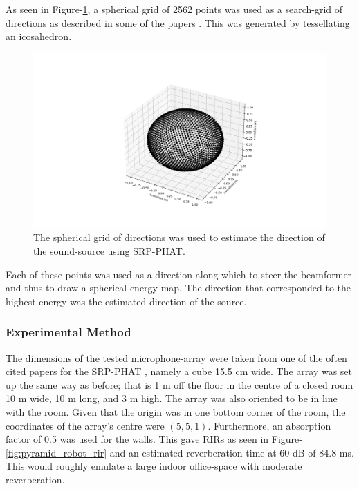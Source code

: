 \documentclass[notitlepage]{report}
\begin{document}
As seen in Figure-\ref{fig:srp_phat_grid}, a spherical grid of 2562 points was used as a search-grid of directions as described in some of the papers \cite{valin_localization_2004} \cite{valin_robust_2007}. This was generated by tessellating an icosahedron.

\begin{figure}[H]
\includegraphics[width=1\textwidth]{../Python/srp_phat/grid.png}
\centering
\caption{The spherical grid of directions was used to estimate the direction of the sound-source using SRP-PHAT.}
\label{fig:srp_phat_grid}
\centering
\end{figure}

Each of these points was used as a direction along which to steer the beamformer and thus to draw a spherical energy-map. The direction that corresponded to the highest energy was the estimated direction of the source.

\subsubsection{Experimental Method}

The dimensions of the tested microphone-array were taken from one of the often cited papers for the SRP-PHAT \cite{valin_robust_2007}, namely a cube 15.5 \si{cm} wide. The array was set up the same way as before; that is 1 \si{m} off the floor in the centre of a closed room 10 \si{m} wide, 10 \si{m} long, and 3 \si{m} high. The array was also oriented to be in line with the room. Given that the origin was in one bottom corner of the room, the coordinates of the array's centre were $(5,5,1)$. Furthermore, an absorption factor of 0.5 was used for the walls. This gave RIRs as seen in Figure-\ref{fig:pyramid_robot_rir} and an estimated reverberation-time at 60 \si{dB} of 84.8 \si{ms}. This would roughly emulate a large indoor office-space with moderate reverberation.
\end{document}
